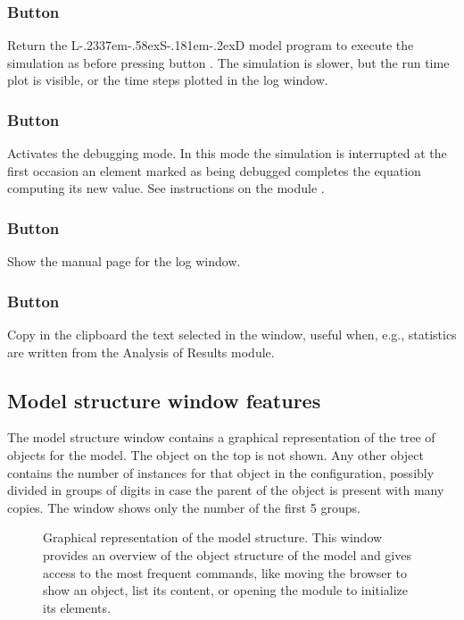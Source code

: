 \documentclass [11pt,a4paper] {book}
\def\LsD{{L\kern-.2337em\lower-.58ex\hbox{S}\kern-.181em\lower-.2ex\hbox{D}}\xspace}
\begin{document}
\subsubsection{Button }
Return the \LsD model program to execute the simulation as before pressing button . The simulation is slower, but the run time plot is visible, or the time steps plotted in the log window.

\subsubsection{Button }

Activates the debugging mode. In this mode the simulation is interrupted at the first occasion an element marked as being debugged completes the equation computing its new value. See instructions on the module \menu{\LsD debugger}. 


\subsubsection{Button }
Show the manual page for the log window.

\subsubsection{Button }
Copy in the clipboard the text selected in the  window, useful when, e.g., statistics are written from the Analysis of Results module.

\subsection{Model structure window features}
The model structure window contains a graphical representation of the tree of objects for the model. The object  on the top is not shown. Any other object contains the number of instances for that object in the configuration, possibly divided in groups of digits in case the parent of the object is present with many copies. The window shows only the number of the first 5 groups.

\begin{figure}[ht]
  \centering
  \caption{\small Graphical representation of the model structure. This window provides an overview of the object structure of the model and gives access to the most frequent commands, like moving the browser to show an object, list its content, or opening the module to initialize its elements.}
   \label{fig:model_structure}
\end{figure}
\end{document}

